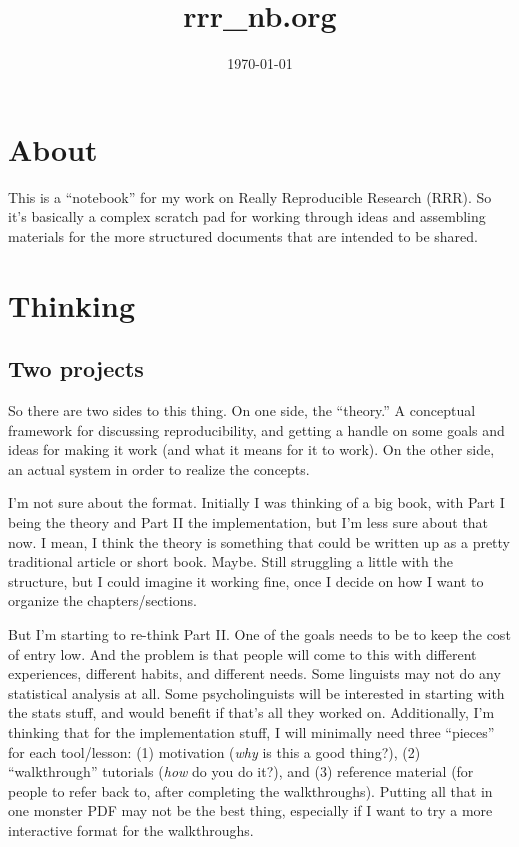 \documentclass[11pt]{article}
\title{rrr\_nb.org}
\author{}
\date{\today}
\begin{document}
\maketitle

\setcounter{tocdepth}{4}
\tableofcontents
\vspace*{1cm}

\section{About}
\label{sec-1}

This is a ``notebook'' for my work on Really Reproducible Research (RRR). So it's basically a complex scratch pad for working through ideas and assembling materials for the more structured documents that are intended to be shared.
\section{Thinking}
\label{sec-2}
\subsection{Two projects}
\label{sec-2-1}

So there are two sides to this thing.  On one side, the ``theory.''  A conceptual framework for discussing reproducibility, and getting a handle on some goals and ideas for making it work (and what it means for it to work). On the other side, an actual system in order to realize the concepts. 

I'm not sure about the format.  Initially I was thinking of a big book, with Part I being the theory and Part II the implementation, but I'm less sure about that now.  I mean, I think the theory is something that could be written up as a pretty traditional article or short book. Maybe.  Still struggling a little with the structure, but I could imagine it working fine, once I decide on how I want to organize the chapters/sections. 

But I'm starting to re-think Part II. One of the goals needs to be to keep the cost of entry low.  And the problem is that people will come to this with different experiences, different habits, and different needs.  Some linguists may not do any statistical analysis at all.  Some psycholinguists will be interested in starting with the stats stuff, and would benefit if that's all they worked on. Additionally, I'm thinking that for the implementation stuff, I will minimally need three ``pieces'' for each tool/lesson: (1) motivation (\emph{why} is this a good thing?), (2) ``walkthrough'' tutorials (\emph{how} do you do it?), and (3) reference material (for people to refer back to, after completing the walkthroughs).  Putting all that in one monster PDF may not be the best thing, especially if I want to try a more interactive format for the walkthroughs.
\end{document}
